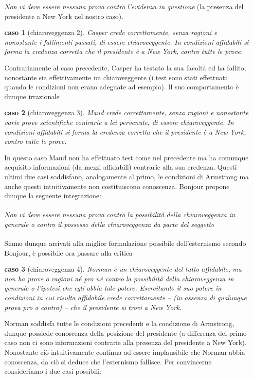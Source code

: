 \documentclass[10pt,a4paper]{article}
\newtheorem{caso}{caso}
\begin{document}
\textit{Non vi deve essere nessuna prova contro l'evidenza in questione} (la presenza del presidente a New York nel nostro caso). 
\begin{caso}[chiaroveggenza 2]
	Casper crede correttamente, senza ragioni e nonostante i fallimenti passati, di essere chiaroveggente. In condizioni affidabili si forma la credenza corretta che il presidente è a New York, contro tutte le prove. 
\end{caso} 
Contrariamente al caso precedente, Casper ha testato la sua facoltà ed ha fallito, nonostante sia effettivamente un chiaroveggente (i test sono stati effettuati quando le condizioni non erano adeguate ad esempio). Il suo comportamento è dunque irrazionale 
\begin{caso}[chiaroveggenza 3]
	Maud crede correttamente, senza ragioni e nonostante varie prove scientifiche contrarie a lei pervenute, di essere chiaroveggente. In condizioni affidabili si forma la credenza corretta che il presidente è a New York, contro tutte le prove. 
\end{caso} 
In questo caso Maud non ha effettuato test come nel precedente ma ha comunque acquisito informazioni (da mezzi affidabili) contrarie alla sua credenza. Questi ultimi due casi soddisfano, analogamente al primo, le condizioni di Armstrong ma anche questi intuitivamente non costituiscono conoscenza. Bonjour propone dunque la seguente integrazione:\\\\
\textit{Non vi deve essere nessuna prova contro la possibilità della chiaroveggenza in generale o contro il possesso della chiaroveggenza da parte del soggetto}\\\\
Siamo dunque arrivati alla miglior formulazione possibile dell'esternismo secondo Bonjour, è possibile ora passare alla critica
\begin{caso}[chiaroveggenza 4]
	Norman è un chiaroveggente del tutto affidabile, ma non ha prove o ragioni né pro né contro la possibilità della chiaroveggenza in generale o l’ipotesi che egli abbia tale potere. Esercitando il suo potere in condizioni in cui risulta affidabile crede correttamente – (in assenza di qualunque prova pro o contro) – che il presidente si trovi a New York.
\end{caso} 
Norman soddisfa tutte le condizioni precedenti e la condizione di Armstrong, dunque possiede conoscenza della posizione del presidente (a differenza del primo caso non ci sono informazioni contrarie alla presenza del presidente a New York). Nonostante ciò intuitivamente continua ad essere implausibile che Norman abbia conoscenza, da ciò si deduce che l'esternismo fallisce. Per convincerne consideriamo i due casi possibili:
\end{document}
